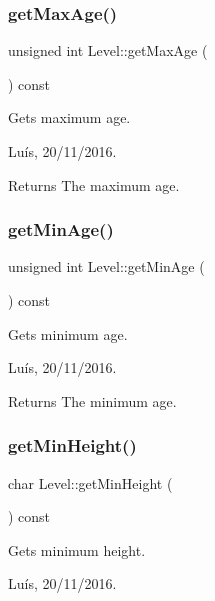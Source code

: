 \subsubsection{\texorpdfstring{get\+Max\+Age()}{getMaxAge()}}
{\footnotesize\ttfamily unsigned int Level\+::get\+Max\+Age (\begin{DoxyParamCaption}{ }\end{DoxyParamCaption}) const}



Gets maximum age. 

Luís, 20/11/2016. 

\begin{DoxyReturn}{Returns}
The maximum age. 
\end{DoxyReturn}
\hypertarget{class_level_ab773a1c1c9ecfa31c45d5e3e48b38a92}{}\label{class_level_ab773a1c1c9ecfa31c45d5e3e48b38a92} 
\subsubsection{\texorpdfstring{get\+Min\+Age()}{getMinAge()}}
{\footnotesize\ttfamily unsigned int Level\+::get\+Min\+Age (\begin{DoxyParamCaption}{ }\end{DoxyParamCaption}) const}



Gets minimum age. 

Luís, 20/11/2016. 

\begin{DoxyReturn}{Returns}
The minimum age. 
\end{DoxyReturn}
\hypertarget{class_level_a1a32dbbb6c0a3e9cfd26870388a02363}{}\label{class_level_a1a32dbbb6c0a3e9cfd26870388a02363} 
\subsubsection{\texorpdfstring{get\+Min\+Height()}{getMinHeight()}}
{\footnotesize\ttfamily char Level\+::get\+Min\+Height (\begin{DoxyParamCaption}{ }\end{DoxyParamCaption}) const}



Gets minimum height. 

Luís, 20/11/2016. 


